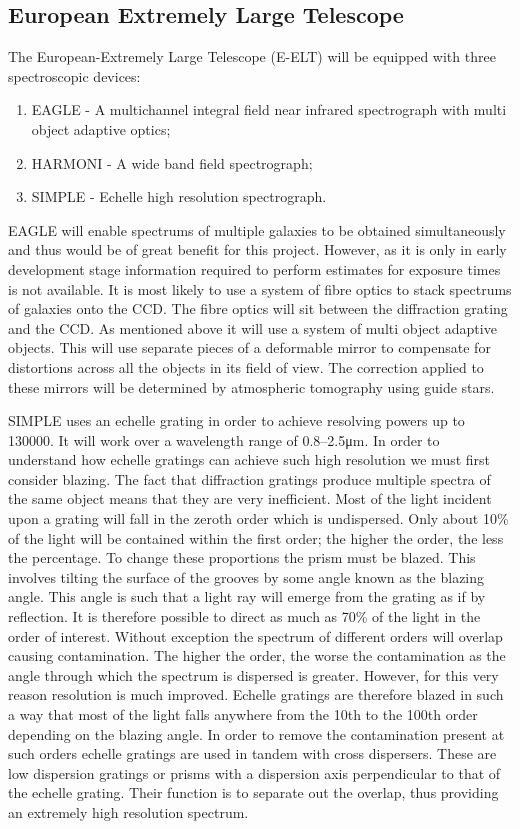 		\subsection{European Extremely Large Telescope} %
		\label{sub:european_extremely_large_telescope}
			The European-Extremely Large Telescope (E-ELT) will be equipped with three spectroscopic devices:
			\begin{enumerate}
				\item EAGLE - A multichannel integral field near infrared spectrograph with multi object adaptive optics;
				\item HARMONI - A wide band field spectrograph;
				\item SIMPLE - Echelle high resolution spectrograph.
			\end{enumerate}
			EAGLE will enable spectrums of multiple galaxies to be obtained simultaneously and thus would be of great benefit for this project. However, as it is only in early development stage information required to perform estimates for exposure times is not available. It is most likely to use a system of fibre optics to stack spectrums of galaxies onto the CCD. The fibre optics will sit between the diffraction grating and the CCD. As mentioned above it will use a system of multi object adaptive objects. This will use separate pieces of a deformable mirror to compensate for distortions across all the objects in its field of view. The correction applied to these mirrors will be determined by atmospheric tomography using guide stars\cite{MultiObjectAOptics}.

			SIMPLE uses an echelle grating in order to achieve resolving powers up to \num{130000}. It will work over a wavelength range of 0.8--2.5\si{\micro\metre}. In order to understand how echelle gratings can achieve such high resolution we must first consider blazing. The fact that diffraction gratings produce multiple spectra of the same object means that they are very inefficient. Most of the light incident upon a grating will fall in the zeroth order which is undispersed. Only about 10\% of the light will be contained within the first order; the higher the order, the less the percentage. To change these proportions the prism must be blazed. This involves tilting the surface of the grooves by some angle known as the blazing angle. This angle is such that a light ray will emerge from the grating as if by reflection. It is therefore possible to direct as much as 70\% of the light in the order of interest. Without exception the spectrum of different orders will overlap causing contamination. The higher the order, the worse the contamination as the angle through which the spectrum is dispersed is greater. However, for this very reason resolution is much improved. Echelle gratings are therefore blazed in such a way that most of the light falls anywhere from the 10th to the 100th order depending on the blazing angle. In order to remove the contamination present at such orders echelle gratings are used in tandem with cross dispersers. These are low dispersion gratings or prisms with a dispersion axis perpendicular to that of the echelle grating. Their function is to separate out the overlap, thus providing an extremely high resolution spectrum\cite{SIMPLEechelle}\cite{Echelleprinc}.

